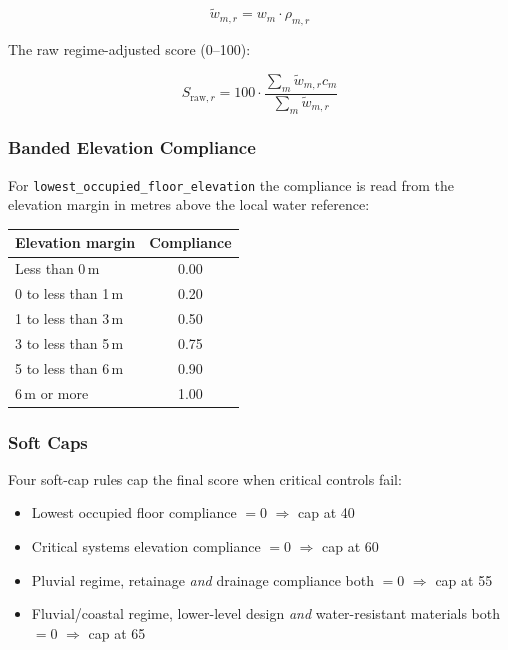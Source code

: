 \documentclass[11pt,a4paper]{article}
\begin{document}
\begin{equation}
    \tilde{w}_{m,r} = w_m \cdot \rho_{m,r}
\end{equation}

\noindent The raw regime-adjusted score (0--100):

\begin{equation}
    S_{\text{raw}, r} = 100 \cdot \frac{\sum_m \tilde{w}_{m,r} c_m}{\sum_m \tilde{w}_{m,r}}
\end{equation}

\subsubsection{Banded Elevation Compliance}
For \texttt{lowest\_occupied\_floor\_elevation} the compliance is read from the
elevation margin in metres above the local water reference:

\begin{center}
\begin{tabular}{lc}
    \toprule
    \textbf{Elevation margin} & \textbf{Compliance} \\
    \midrule
    Less than 0\,m       & 0.00 \\
    0 to less than 1\,m  & 0.20 \\
    1 to less than 3\,m  & 0.50 \\
    3 to less than 5\,m  & 0.75 \\
    5 to less than 6\,m  & 0.90 \\
    6\,m or more         & 1.00 \\
    \bottomrule
\end{tabular}
\end{center}

\subsubsection{Soft Caps}
Four soft-cap rules cap the final score when critical controls fail:

\begin{itemize}[nosep]
    \item Lowest occupied floor compliance $= 0$ $\Rightarrow$ cap at 40
    \item Critical systems elevation compliance $= 0$ $\Rightarrow$ cap at 60
    \item Pluvial regime, retainage \emph{and} drainage compliance both $= 0$ $\Rightarrow$ cap at 55
    \item Fluvial/coastal regime, lower-level design \emph{and} water-resistant
          materials both $= 0$ $\Rightarrow$ cap at 65
\end{itemize}
\end{document}
